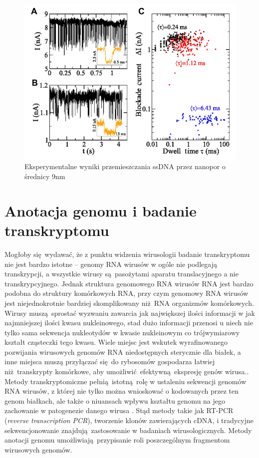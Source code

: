 \documentclass[two column, twoside, a4paper]{article}
\begin{document}
\begin{figure}[bt]
\begin{tcolorbox}
	\centering
	\includegraphics[width=\textwidth]{./figury/nanopore_experimental.png}
	\caption{Eksperymentalne wyniki przemieszczania ssDNA przez nanopor o średnicy 9nm}
\end{tcolorbox}
\end{figure}

\section{Anotacja genomu i badanie transkryptomu}

 Mogłoby się wydawać, że z punktu widzenia wirusologii badanie transkryptomu nie jest bardzo istotne -- genomy RNA wirusów w ogóle nie podlegają transkrypcji, a wszystkie wirusy są pasożytami aparatu translacyjnego a nie transkrypcyjnego. Jednak struktura genomowego RNA wirusów RNA jest bardzo podobna do struktury komórkowych RNA, przy czym genomowy RNA wirusów jest niejednokrotnie bardziej skomplikowany niż RNA organizmów komórkowych. Wirusy muszą sprostać wyzwaniu zawarcia jak największej ilości informacji w jak najmniejszej ilości kwasu nukleinowego, stad dużo informacji przenosi u niech nie tylko sama sekwencja nukleotydów w kwasie nukleinowym co trójwymiarowy kształt cząsteczki tego kwasu. Wiele miejsc jest wskutek wyrafinowanego pozwijania wirusowych genomów RNA niedostępnych sterycznie dla białek, a inne miejsca muszą przyłączać się do rybosomów gospodarza łatwiej niż transkrypty komórkowe, aby umożliwić efektywną ekspresję genów wirusa.. Metody transkryptomiczne pełnią istotną rolę w ustaleniu sekwencji genomów RNA wirusów, z której nie tylko można wnioskować o kodowanych przez ten genom białkach, ale także o niuansach wpływu kształtu genomu na jego zachowanie w patogenezie danego wirusa \autocite{Piekarowicz2013}. Stąd metody takie jak RT-PCR (\textit{reverse transcription PCR}), tworzenie klonów zawierających cDNA, i tradycyjne sekwencjonowanie znajdują zastosowanie w badaniach wirusologicznych. Metody anotacji genomu umożliwiają przypisanie roli poszczególnym fragmentom wirusowych genomów.
\end{document}
